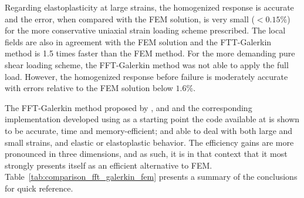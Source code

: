 Regarding elastoplasticity at large strains, the homogenized response is accurate and the error, when compared with the FEM solution, is very small (\(<0.15\%\)) for the more conservative uniaxial strain loading scheme prescribed.
The local fields are also in agreement with the FEM solution and the FTT-Galerkin method is 1.5 times faster than the FEM method.
For the more demanding pure shear loading scheme, the FFT-Galerkin method was not able to apply the full load.
However, the homogenized response before failure is moderately accurate with errors relative to the FEM solution below \(1.6\%\).

The FFT-Galerkin method proposed by \cite{vondrejc_fft-based_2014}, \cite{zeman_finite_2017} and \cite{de_geus_finite_2017} and the corresponding implementation developed using as a starting point the code available at \cite{de_geus_notitle_nodate} is shown to be accurate, time and memory-efficient; and able to deal with both large and small strains, and elastic or elastoplastic behavior.
The efficiency gains are more pronounced in three dimensions, and as such, it is in that context that it most strongly presents itself as an efficient alternative to FEM.
Table~\ref{tab:comparison_fft_galerkin_fem} presents a summary of the conclusions for quick reference.

